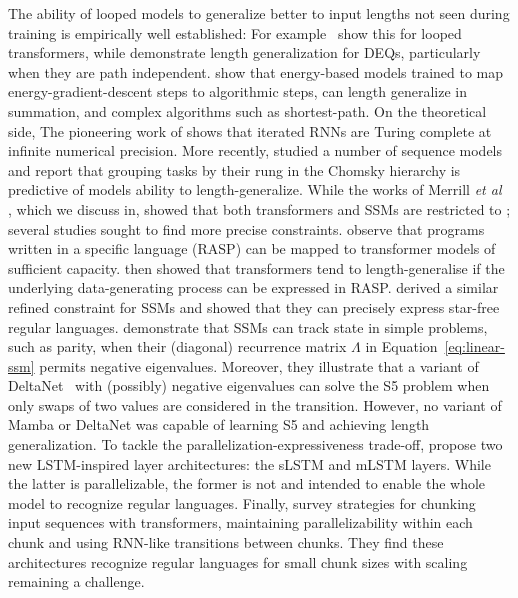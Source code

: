 The ability of looped models to generalize better to input lengths not seen during training is empirically well established: For example~\citet{Yang_Lee_Nowak_Papailiopoulos_2024} show this for looped transformers, while \citet{anil2022path} demonstrate length generalization for DEQs, particularly when they are path independent.
\citet{Du_Li_Tenenbaum_Mordatch} show that energy-based models trained to map energy-gradient-descent steps to algorithmic steps, can length generalize in summation, and complex algorithms such as shortest-path.
On the theoretical side,
The pioneering work of \citet{siegelmann1992} shows that iterated RNNs are Turing complete at infinite numerical precision. 
More recently, \citet{deletang2023neural} studied a number of sequence models and report that grouping tasks by their rung in the Chomsky hierarchy is predictive of models ability to length-generalize. 
While the works of Merrill \emph{et al}~ \cite{merrill2019sequential, merrill2020formal, Merrill_Sabharwal_2023, merrill2024illusion}, which we discuss in, showed that both transformers and SSMs are restricted to \tc; several studies sought to find more precise constraints.
\citet{Weiss_Goldberg_Yahav_2021} observe that programs written in a specific language (RASP) can be mapped to transformer models of sufficient capacity.
\citet{Zhou_Bradley_Littwin_Razin_Saremi_Susskind_Bengio_Nakkiran_2024} then showed that transformers tend to length-generalise if the underlying data-generating process can be expressed in RASP.
\citet{sarrof2024expressive} derived a similar refined constraint for SSMs and showed that they can precisely express star-free regular languages.
\citet{Grazzi_Siems_Franke_Zela_Hutter_Pontil_2024} demonstrate that SSMs can track state in simple problems, such as parity, when their (diagonal) recurrence matrix \(\Lambda\) in Equation~\eqref{eq:linear-ssm} permits negative eigenvalues.
Moreover, they illustrate that a variant of DeltaNet~\cite{Yang_Wang_Zhang_Shen_Kim} with (possibly) negative eigenvalues can solve the S5 problem when only swaps of two values are considered in the transition.
However, no variant of Mamba or DeltaNet was capable of learning S5 and achieving length generalization.
To tackle the parallelization-expressiveness trade-off, \citet{Beck_Pöppel_Spanring_Auer_Prudnikova_Kopp_Klambauer_Brandstetter_Hochreiter} propose two new LSTM-inspired layer architectures: the sLSTM and mLSTM layers.
While the latter is parallelizable, the former is not and intended to enable the whole model to recognize regular languages.
Finally, \citet{soulos2024recurrent} survey strategies for chunking input sequences with transformers, maintaining parallelizability within each chunk and using RNN-like transitions between chunks.
They find these architectures recognize regular languages for small chunk sizes with scaling remaining a challenge.